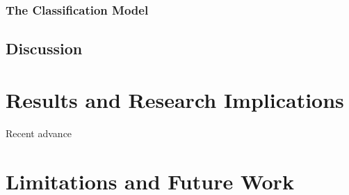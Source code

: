 \subsubsection{The Classification Model}
\label{subsubsec:PenCTClassification}


\subsection{Discussion}
\label{subsec:PenCTDiscussion}



\section{Results and Research Implications}
\label{sec:PenImplications}

Recent advance

\section{Limitations and Future Work}
\label{sec:PenLimitations}